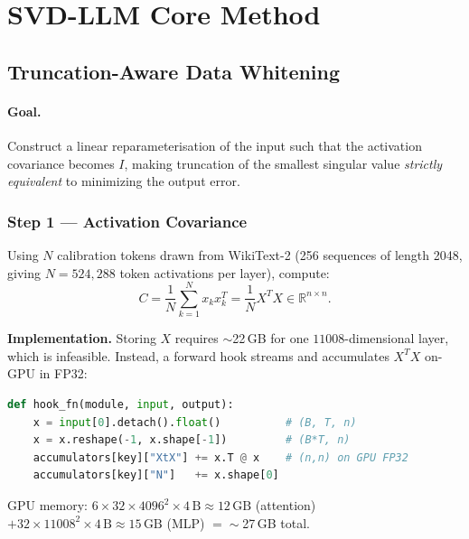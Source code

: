 \documentclass[11pt,a4paper]{article}
\newcommand{\Rbb}{\mathbb{R}}
\theoremstyle{remark}
\begin{document}
\section{SVD-LLM Core Method}

\subsection{Truncation-Aware Data Whitening}
\label{sec:whitening}

\paragraph{Goal.}
Construct a linear reparameterisation of the input such that the activation
covariance becomes $I$, making truncation of the smallest singular value
\emph{strictly equivalent} to minimizing the output error.

\subsubsection*{Step 1 --- Activation Covariance}

Using $N$ calibration tokens drawn from WikiText-2 (256 sequences of length
2048, giving $N = 524{,}288$ token activations per layer), compute:
\begin{equation}
  C = \frac{1}{N}\sum_{k=1}^N x_k x_k^T
    = \frac{1}{N}X^T X \in \Rbb^{n\times n}.
\end{equation}

\textbf{Implementation.}  Storing $X$ requires $\sim$22\,GB for one
$11008$-dimensional layer, which is infeasible.  Instead, a forward hook
streams and accumulates $X^TX$ on-GPU in FP32:

\begin{lstlisting}[language=Python, caption={Streaming covariance accumulation.}]
def hook_fn(module, input, output):
    x = input[0].detach().float()          # (B, T, n)
    x = x.reshape(-1, x.shape[-1])         # (B*T, n)
    accumulators[key]["XtX"] += x.T @ x    # (n,n) on GPU FP32
    accumulators[key]["N"]   += x.shape[0]
\end{lstlisting}

GPU memory: $6 \times 32 \times 4096^2 \times 4\,\text{B} \approx 12\,\text{GB}$
(attention) $+ 32 \times 11008^2 \times 4\,\text{B} \approx 15\,\text{GB}$
(MLP) $= \sim$27\,GB total.
\end{document}

